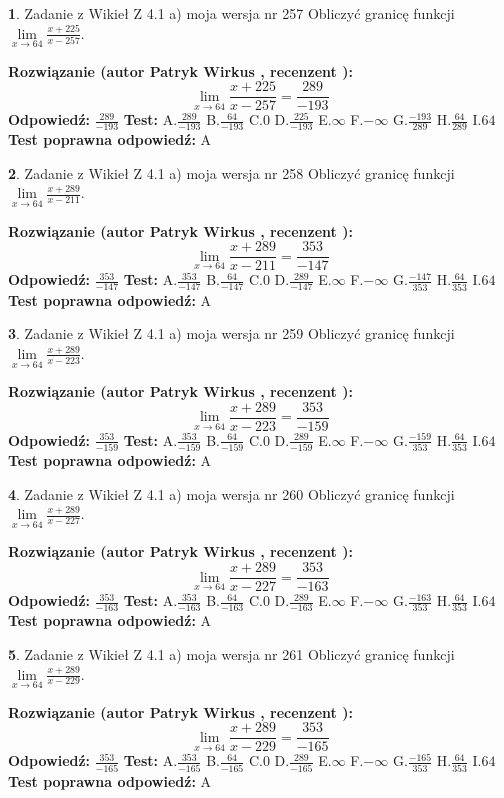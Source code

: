 \documentclass[12pt, a4paper]{article}
\theoremstyle{definition} %
\newtheorem{zad}{}
\newcommand{\zadStart}[1]{\begin{zad}#1\newline}
\newcommand{\zadStop}{\end{zad}}
\newcommand{\rozwStart}[2]{\noindent \textbf{Rozwiązanie (autor #1 , recenzent #2): }\newline}
\newcommand{\rozwStop}{\newline}
\newcommand{\odpStart}{\noindent \textbf{Odpowiedź:}\newline}
\newcommand{\odpStop}{\newline}
\newcommand{\testStart}{\noindent \textbf{Test:}\newline}
\newcommand{\testStop}{\newline}
\newcommand{\kluczStart}{\noindent \textbf{Test poprawna odpowiedź:}\newline}
\newcommand{\kluczStop}{\newline}
\begin{document}
\zadStart{Zadanie z Wikieł Z 4.1 a) moja wersja nr 257}
Obliczyć granicę funkcji $\lim\limits_{x\to64}\frac{x+225}{x-257}$.
\zadStop
\rozwStart{Patryk Wirkus}{}
$$\lim\limits_{x\to64}\frac{x+225}{x-257} = \frac{289}{-193}$$
\rozwStop
\odpStart
$\frac{289}{-193}$
\odpStop
\testStart
A.$\frac{289}{-193}$
B.$\frac{64}{-193}$
C.$0$
D.$\frac{225}{-193}$
E.$\infty$
F.$-\infty$
G.$\frac{-193}{289}$
H.$\frac{64}{289}$
I.$64$
\testStop
\kluczStart
A
\kluczStop



\zadStart{Zadanie z Wikieł Z 4.1 a) moja wersja nr 258}
Obliczyć granicę funkcji $\lim\limits_{x\to64}\frac{x+289}{x-211}$.
\zadStop
\rozwStart{Patryk Wirkus}{}
$$\lim\limits_{x\to64}\frac{x+289}{x-211} = \frac{353}{-147}$$
\rozwStop
\odpStart
$\frac{353}{-147}$
\odpStop
\testStart
A.$\frac{353}{-147}$
B.$\frac{64}{-147}$
C.$0$
D.$\frac{289}{-147}$
E.$\infty$
F.$-\infty$
G.$\frac{-147}{353}$
H.$\frac{64}{353}$
I.$64$
\testStop
\kluczStart
A
\kluczStop



\zadStart{Zadanie z Wikieł Z 4.1 a) moja wersja nr 259}
Obliczyć granicę funkcji $\lim\limits_{x\to64}\frac{x+289}{x-223}$.
\zadStop
\rozwStart{Patryk Wirkus}{}
$$\lim\limits_{x\to64}\frac{x+289}{x-223} = \frac{353}{-159}$$
\rozwStop
\odpStart
$\frac{353}{-159}$
\odpStop
\testStart
A.$\frac{353}{-159}$
B.$\frac{64}{-159}$
C.$0$
D.$\frac{289}{-159}$
E.$\infty$
F.$-\infty$
G.$\frac{-159}{353}$
H.$\frac{64}{353}$
I.$64$
\testStop
\kluczStart
A
\kluczStop



\zadStart{Zadanie z Wikieł Z 4.1 a) moja wersja nr 260}
Obliczyć granicę funkcji $\lim\limits_{x\to64}\frac{x+289}{x-227}$.
\zadStop
\rozwStart{Patryk Wirkus}{}
$$\lim\limits_{x\to64}\frac{x+289}{x-227} = \frac{353}{-163}$$
\rozwStop
\odpStart
$\frac{353}{-163}$
\odpStop
\testStart
A.$\frac{353}{-163}$
B.$\frac{64}{-163}$
C.$0$
D.$\frac{289}{-163}$
E.$\infty$
F.$-\infty$
G.$\frac{-163}{353}$
H.$\frac{64}{353}$
I.$64$
\testStop
\kluczStart
A
\kluczStop



\zadStart{Zadanie z Wikieł Z 4.1 a) moja wersja nr 261}
Obliczyć granicę funkcji $\lim\limits_{x\to64}\frac{x+289}{x-229}$.
\zadStop
\rozwStart{Patryk Wirkus}{}
$$\lim\limits_{x\to64}\frac{x+289}{x-229} = \frac{353}{-165}$$
\rozwStop
\odpStart
$\frac{353}{-165}$
\odpStop
\testStart
A.$\frac{353}{-165}$
B.$\frac{64}{-165}$
C.$0$
D.$\frac{289}{-165}$
E.$\infty$
F.$-\infty$
G.$\frac{-165}{353}$
H.$\frac{64}{353}$
I.$64$
\testStop
\kluczStart
A
\kluczStop
\end{document}
